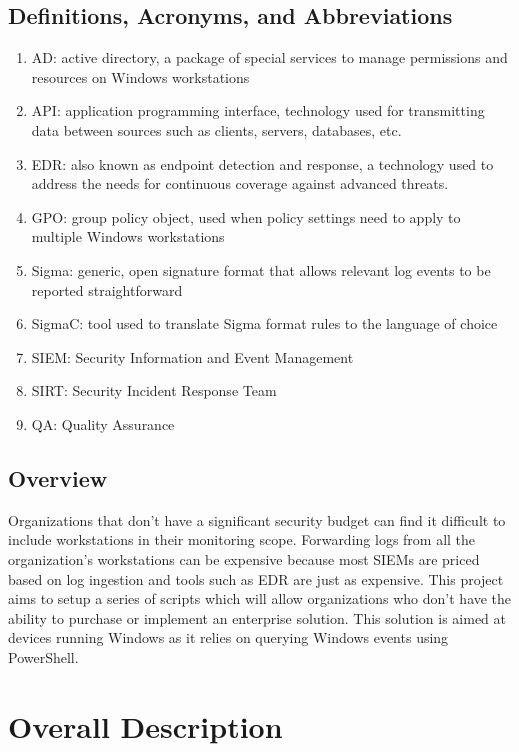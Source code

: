 \documentclass{scrreprt}
\begin{document}
\section{Definitions, Acronyms, and Abbreviations}
\begin{enumerate}
    \item AD: active directory, a package of special services to manage permissions and resources on Windows workstations
    \item API: application programming interface, technology used for transmitting data between sources such as clients, servers, databases, etc.
    \item EDR: also known as endpoint detection and response, a technology used to address the needs for continuous coverage against advanced threats.
    \item GPO: group policy object, used when policy settings need to apply to multiple Windows workstations
    \item Sigma: generic, open signature format that allows relevant log events to be reported straightforward
    \item SigmaC: tool used to translate Sigma format rules to the language of choice
    \item SIEM: Security Information and Event Management
    \item SIRT: Security Incident Response Team
    \item QA: Quality Assurance
\end{enumerate}

\section{Overview}
Organizations that don’t have a significant security budget can find it difficult to include workstations in their monitoring scope. Forwarding logs from all the organization’s workstations can be expensive because most SIEMs are priced based on log ingestion and tools such as EDR are just as expensive. This project aims to setup a series of scripts which will allow organizations who don’t have the ability to purchase or implement an enterprise solution.  This solution is aimed at devices running Windows as it relies on querying Windows events using PowerShell.

\chapter{Overall Description}
\end{document}
